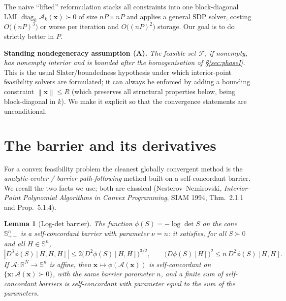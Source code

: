 \documentclass{amsart}
\newtheorem{lemma}{Lemma}
\newcommand{\Sym}{\mathbb{S}}
\newcommand{\R}{\mathbb{R}}
\newcommand{\diag}{\operatorname{diag}}
\newcommand{\norm}[1]{\left\lVert#1\right\rVert}
\begin{document}
The naive ``lifted'' reformulation stacks all constraints into one block-diagonal
LMI $\diag_k\mathcal A_k(\bm x)\succ0$ of size $nP\times nP$ and applies a general
SDP solver, costing $O\!\big((nP)^3\big)$ or worse per iteration and
$O\!\big((nP)^2\big)$ storage. Our goal is to do strictly better in $P$.

\medskip
\noindent\textbf{Standing nondegeneracy assumption (A).}
\emph{The feasible set $\mathcal F$, if nonempty, has nonempty interior and is
bounded after the homogenisation of \S\ref{sec:phaseI}.} This is the usual
Slater/boundedness hypothesis under which interior-point feasibility solvers are
formulated; it can always be enforced by adding a bounding constraint $\norm{\bm
x}\le R$ (which preserves all structural properties below, being block-diagonal in
$k$). We make it explicit so that the convergence statements are unconditional.

\section{The barrier and its derivatives}\label{sec:barrier}

For a convex feasibility problem the cleanest globally convergent method is the
\emph{analytic-center / barrier path-following} method built on a self-concordant
barrier. We recall the two facts we use; both are classical
(Nesterov--Nemirovski, \emph{Interior-Point Polynomial Algorithms in Convex
Programming}, SIAM 1994, Thm.~2.1.1 and Prop.~5.1.4).

\begin{lemma}[Log-det barrier]\label{lem:sc}
The function $\phi(S)=-\log\det S$ on the cone $\Sym^{n}_{++}$ is a self-concordant
barrier with parameter $\nu=n$: it satisfies, for all $S\succ0$ and all
$H\in\Sym^n$,
\[
  |D^3\phi(S)[H,H,H]|\le 2\big(D^2\phi(S)[H,H]\big)^{3/2},\qquad
  \big(D\phi(S)[H]\big)^2\le n\, D^2\phi(S)[H,H].
\]
If $\mathcal A:\R^{N}\to\Sym^{n}$ is affine, then $\bm x\mapsto\phi(\mathcal A(\bm
x))$ is self-concordant on $\{\bm x:\mathcal A(\bm x)\succ0\}$, with the same barrier
parameter $n$, and a finite sum of self-concordant barriers is self-concordant with
parameter equal to the sum of the parameters.
\end{lemma}
\end{document}
